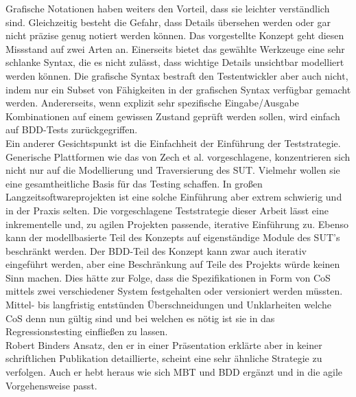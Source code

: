 Grafische Notationen haben weiters den Vorteil, dass sie leichter verständlich sind. Gleichzeitig besteht die Gefahr, dass Details übersehen werden oder gar nicht präzise genug notiert werden können. Das vorgestellte Konzept geht diesen Missstand auf zwei Arten an. Einerseits bietet das gewählte Werkzeuge eine sehr schlanke Syntax, die es nicht zulässt, dass wichtige Details unsichtbar modelliert werden können. Die grafische Syntax bestraft den Testentwickler aber auch nicht, indem nur ein Subset von Fähigkeiten in der grafischen Syntax verfügbar gemacht werden. Andererseits, wenn explizit sehr spezifische Eingabe/Ausgabe Kombinationen auf einem gewissen Zustand geprüft werden sollen, wird einfach auf BDD-Tests zurückgegriffen.\\
Ein anderer Gesichtspunkt ist die Einfachheit der Einführung der Teststrategie. Generische Plattformen wie das von Zech et al.\cite{zech_generic_2012} vorgeschlagene, konzentrieren sich nicht nur auf die Modellierung und Traversierung des SUT. Vielmehr wollen sie eine gesamtheitliche Basis für das Testing schaffen. In großen Langzeitsoftwareprojekten ist eine solche Einführung aber extrem schwierig und in der Praxis selten. Die vorgeschlagene Teststrategie dieser Arbeit lässt eine inkrementelle und, zu agilen Projekten passende, iterative Einführung zu. Ebenso kann der modellbasierte Teil des Konzepts auf eigenständige Module des SUT's beschränkt werden. Der BDD-Teil des Konzept kann zwar auch iterativ eingeführt werden, aber eine Beschränkung auf Teile des Projekts würde keinen Sinn machen. Dies hätte zur Folge, dass die Spezifikationen in Form von CoS mittels zwei verschiedener System festgehalten oder versioniert werden müssten. Mittel- bis langfristig entstünden Überschneidungen und Unklarheiten welche CoS denn nun gültig sind und bei welchen es nötig ist sie in das Regressionstesting einfließen zu lassen.\\
Robert Binders Ansatz, den er in einer Präsentation\cite{binder_model-based_2014} erklärte aber in keiner schriftlichen Publikation detaillierte, scheint eine sehr ähnliche Strategie zu verfolgen. Auch er hebt heraus wie sich \Gls{MBT} und BDD ergänzt und in die agile Vorgehensweise passt.


